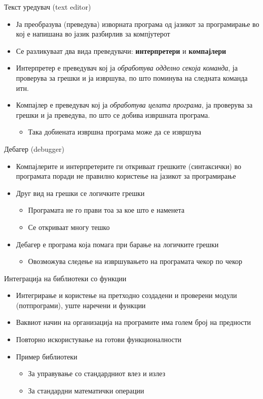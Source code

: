 \begin{frame}{Текст уредувач (text editor)}
\begin{itemize}
  \item Ја преобразува (преведува) изворната програма од јазикот за програмирање
  во кој е напишана во јазик разбирлив за компјутерот
  \item Се разликуваат два вида преведувачи: \textbf{интерпретери} и \textbf{компајлери} 
  \item Интерпретер е преведувач кој ја \emph{обработува одделно секоја команда}, ја
  проверува за грешки и ја извршува, по што поминува на следната команда  итн.
  \item Компајлер е преведувач кој ја \emph{обработува целата програма}, ја проверува
  за грешки и ја преведува, по што се добива извршната програма.
  \begin{itemize}
  \item Така добиената извршна програма може да се извршува
  \end{itemize}
\end{itemize}
\end{frame}

\begin{frame}{Дебагер (debugger)}
\begin{itemize}
  \item Компајлерите и интерпретерите ги откриваат грешките (синтаксички) во
  програмата поради не правилно користење на јазикот за програмирање
  \item Друг вид на грешки се логичките грешки
  \begin{itemize}
  \item Програмата не го прави тоа за кое што е наменета 
  \item Се откриваат многу тешко
  \end{itemize}
  \item Дебагер е програма која помага при барање на логичките грешки
  \begin{itemize}
  \item Овозможува следење на извршувањето на програмата чекор по чекор
  \end{itemize}
\end{itemize}
\end{frame}

\begin{frame}{Интеграција на библиотеки со функции}
\begin{itemize}
  \item Интегрирање и користење на претходно создадени и проверени модули (потпрограми), уште наречени и функции
  \item Ваквиот начин на организација на програмите има голем број на предности
  \item Повторно искористување на готови функционалности
  \item Пример библиотеки
  \begin{itemize}
    \item За управување со стандардниот влез и излез
    \item За стандардни математички операции 
  \end{itemize}
\end{itemize}
\end{frame}

